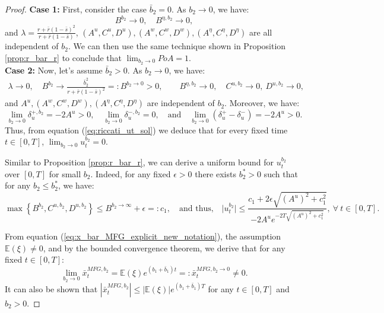 \documentclass[11pt]{article}
\begin{document}
\begin{proof}
	\textbf{Case 1:} First, consider the case $\bar{b}_2 =0$. As $b_2 \to 0$, we have:
	\begin{equation*}
		B^{b_2} \to 0, \quad B^{\eta,b_2} \to 0,
	\end{equation*}
	and $\lambda = \frac{r + \bar{r}(1- \bar{s})^2}{r + \bar{r}(1-\bar{s})}$, $(A^{u},C^{u}, D^{u}), (A^{w}, C^{w}, D^{w}), (A^\eta, C^\eta, D^\eta)$ are all independent of $b_2$. We can then use the same technique shown in Proposition \ref{prop:r_bar_r} to conclude that $\lim_{b_2 \to 0} PoA = 1.$\\
	
	\textbf{Case 2:} Now, let's assume $\bar{b}_2 > 0$.	As $b_2 \to 0$, we have:
	\begin{equation*}
	\begin{array}{l}
		\lambda \longrightarrow 0, \quad \displaystyle B^{b_2} \longrightarrow{}  \frac{\bar{b}_2^2}{r + \bar{r}(1-\bar{s})^2}=:B^{b_2 \to 0} >0, \qquad B^{\eta,b_2} \longrightarrow{} 0, \quad C^{u,b_2} \longrightarrow{} 0, \  D^{u,b_2} \longrightarrow{} 0,
	\end{array}
	\end{equation*}
	and $A^u, (A^w, C^w, D^w), (A^\eta, C^\eta, D^\eta)$ are independent of $b_2$.
	Moreover, we have:
	$$\lim_{b_2 \to 0}\delta^{+,b_2}_u =-2A^u >0, \quad \lim_{b_2 \to 0}\delta^{-,b_2}_u = 0, \quad \text{and} \quad \lim_{b_2 \to 0}(\delta^{+}_u - \delta^{-}_u) = -2 A^u > 0.$$
	Thus, from equation (\ref{eq:riccati_ut_sol}) we deduce that for every fixed time $t \in [0,T]$, $\lim_{b_2 \to 0}u^{b_2}_t = 0.$
	
	Similar to Proposition \ref{prop:r_bar_r}, we can derive a uniform bound for $u_t^{b_2}$ over $[0,T]$ for small $b_2$. Indeed, for any fixed $\epsilon >0$ there exists $b_2^* >0$ such that for any $b_2 \leq b_2^*$, we have:
	$$\max \left\{B^{b_2}, C^{u,b_2}, D^{u,b_2} \right\} \leq B^{b_2 \to \infty} + \epsilon =: c_1, \quad \text{and thus,} \quad
	\vert u_t^{b_2} \vert \leq \frac{c_1 + 2 \epsilon \sqrt{(A^u)^2 + c_1^2} }{- 2 A^u e^{-2T \sqrt{(A^u)^2 + c_1^2} } } ,\ \forall  \  t \in [0,T].$$
	
	From equation (\ref{eq:x_bar_MFG_explicit_new_notation}), the assumption $\mathbb{E}(\xi)\neq 0$, and by the bounded convergence theorem, we derive that for any fixed $t \in [0,T]$:
	$$\lim_{b_2 \to 0} \bar{x}_t^{MFG,b_2} = \mathbb{E}(\xi) e^{(b_1+\bar{b}_1)t} =: \bar{x}_t^{MFG,b_2 \to 0} \neq 0.$$
	It can also be shown that $\left| \bar{x}_t^{MFG,b_2}\right| \leq \vert \mathbb{E}(\xi) \vert e^{(b_1 + \bar{b}_1) T}$ for any $t \in [0,T]$ and $b_2 > 0$.
	

\end{proof}
\end{document}
